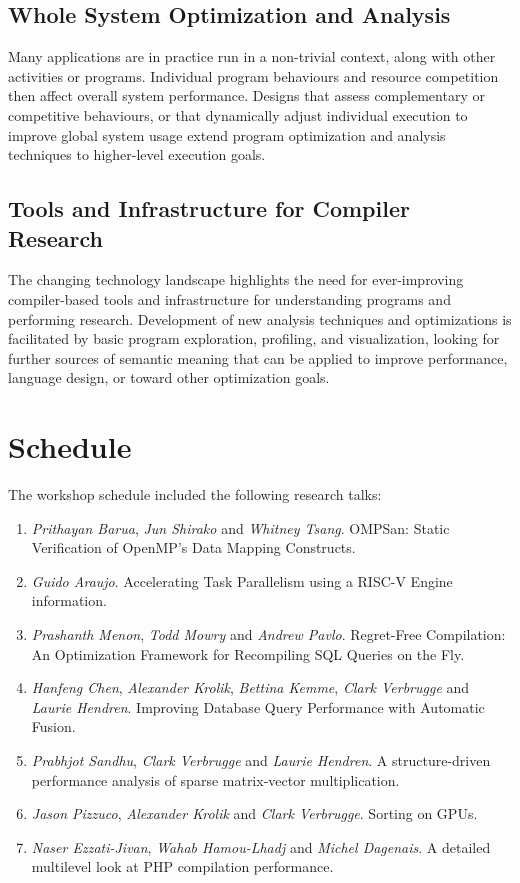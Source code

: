 \documentclass[sigconf]{acmart}
\begin{document}
\subsection{Whole System Optimization and Analysis}

Many applications are in practice run in a non-trivial context, along with other activities or programs. Individual program behaviours and resource competition then affect overall system performance. Designs that assess complementary or competitive behaviours, or that dynamically adjust individual execution to improve global system usage extend program optimization and analysis techniques to higher-level execution goals.

\subsection{Tools and Infrastructure for Compiler Research}

The changing technology landscape highlights the need for ever-improving compiler-based tools and infrastructure for understanding programs and performing research. Development of new analysis techniques and optimizations is facilitated by basic program exploration, profiling, and visualization, looking for further sources of semantic meaning that can be applied to improve performance, language design, or toward other optimization goals. 

\section{Schedule}
The workshop schedule included the following research talks:

\begin{enumerate}
\item \textit{Prithayan Barua}, \textit{Jun Shirako} and \textit{Whitney Tsang}. OMPSan: Static Verification of OpenMP's Data Mapping Constructs.
\item \textit{Guido Araujo}. Accelerating Task Parallelism using a RISC-V Engine information.
\item \textit{Prashanth Menon}, \textit{Todd Mowry} and \textit{Andrew Pavlo}. Regret-Free Compilation: An Optimization Framework for Recompiling SQL Queries on the Fly.
\item \textit{Hanfeng Chen}, \textit{Alexander Krolik}, \textit{Bettina Kemme}, \textit{Clark Verbrugge} and \textit{Laurie Hendren}. Improving Database Query Performance with Automatic Fusion.
\item \textit{Prabhjot Sandhu}, \textit{Clark Verbrugge} and \textit{Laurie Hendren}. A structure-driven performance analysis of sparse matrix-vector multiplication.
\item \textit{Jason Pizzuco}, \textit{Alexander Krolik} and \textit{Clark Verbrugge}. Sorting on GPUs.
\item \textit{Naser Ezzati-Jivan}, \textit{Wahab Hamou-Lhadj} and \textit{Michel Dagenais}. A detailed multilevel look at PHP compilation performance.
\end{enumerate}
\end{document}
